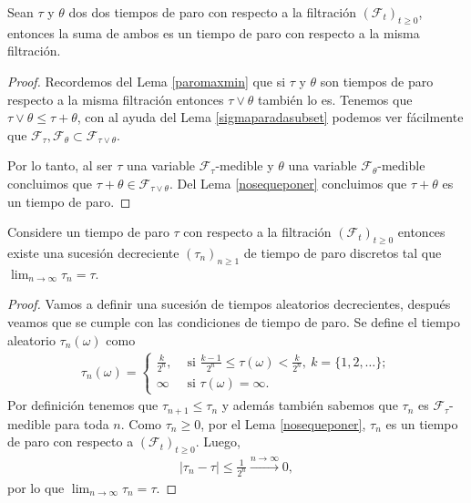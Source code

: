 \begin{lemma}
	Sean $\tau$ y $\theta$ dos dos tiempos de paro con respecto a la filtración $(\mathcal{F}_t)_{t \geq 0}$, entonces la suma de ambos es un tiempo de paro con respecto a la misma filtración.
\end{lemma}
\begin{proof}
	Recordemos del Lema \ref{paromaxmin} que si $\tau$ y $\theta$ son tiempos de paro respecto a la misma filtración entonces $\tau \vee \theta$ también lo es. Tenemos que $\tau \vee \theta \leq \tau + \theta$, con al ayuda del Lema \ref{sigmaparadasubset} podemos ver fácilmente que $\mathcal{F}_{\tau}, \mathcal{F}_{\theta} \subset \mathcal{F}_{\tau \vee \theta}$. 

	Por lo tanto, al ser $\tau$ una variable $\mathcal{F}_{\tau}$-medible y $\theta$ una variable $\mathcal{F}_{\theta}$-medible concluimos que $\tau + \theta \in \mathcal{F}_{\tau \vee \theta}$. Del Lema \ref{nosequeponer} concluimos que $\tau + \theta$ es un tiempo de paro.
\end{proof}

\begin{lemma}
	Considere un tiempo de paro $\tau$ con respecto a la filtración $(\mathcal{F}_t)_{t \geq 0}$ entonces existe una sucesión decreciente $(\tau_n)_{n \geq 1}$ de tiempo de paro discretos tal que $\lim_{n \rightarrow \infty} \tau_n = \tau$.
\end{lemma}
\begin{proof}
	Vamos a definir una sucesión de tiempos aleatorios decrecientes, después veamos que se cumple con las condiciones de tiempo de paro. Se define el tiempo aleatorio $\tau_n (\omega)$ como
	\begin{align*}
		\tau_n (\omega) =
		\begin{cases}
			\frac{k}{2^n}, & \text{ si } \frac{k-1}{2^n} \leq \tau(\omega) < \frac{k}{2^n}, \ k = \{1, 2, \ldots\}; \\
			\infty & \text{ si } \tau(\omega) = \infty.
		\end{cases}
	\end{align*}
    Por definición tenemos que $\tau_{n+1} \leq \tau_n$ y además también sabemos que $\tau_n$ es $\mathcal{F}_{\tau}$-medible para toda $n$. Como $\tau_n \geq 0$, por el Lema \ref{nosequeponer}, $\tau_n$ es un tiempo de paro con respecto a $(\mathcal{F}_t)_{t \geq 0}$. Luego, 
    \begin{align*}
		|\tau_n - \tau| \leq \frac{1}{2^n} \xrightarrow{n \rightarrow \infty} 0,
	\end{align*}
    por lo que $\lim_{n \rightarrow \infty} \tau_n = \tau$.
\end{proof}

